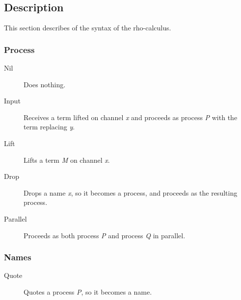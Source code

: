\subsection{Description}
This section describes of the syntax of the rho-calculus.

\subsubsection{Process}
\begin{description}
\item[Nil] Does nothing.
\item[Input] Receives a term lifted on channel \textit{x} and proceeds as process \textit{P} with the term replacing \textit{y}.
\item[Lift] Lifts a term \textit{M} on channel \textit{x}.
\item[Drop] Drops a name \textit{x}, so it becomes a process, and proceeds as the resulting process.
\item[Parallel] Proceeds as both process \textit{P} and process \textit{Q} in parallel.
\end{description}


\subsubsection{Names}
\begin{description}
\item[Quote] Quotes a process \textit{P}, so it becomes a name.
\end{description}


